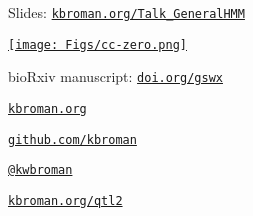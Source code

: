 \documentclass[aspectratio=169,12pt,t]{beamer}
\begin{document}
\begin{frame}[c]{}

\Large

Slides: \href{https://kbroman.org/Talk_GeneralHMM}{\tt kbroman.org/Talk\_GeneralHMM}

\vspace*{-7mm}
\hfill
\href{https://creativecommons.org/publicdomain/zero/1.0/}{\texttt{[image: Figs/cc-zero.png]}}

\vspace{3mm}

bioRxiv manuscript:
\href{https://doi.org/gswx}{\tt \lolit doi.org/gswx}

\vspace{4mm}

\href{https://kbroman.org}{\tt \lolit kbroman.org}

\vspace{4mm}

\href{https://github.com/kbroman}{\tt \lolit github.com/kbroman}

\vspace{4mm}

\href{https://twitter.com/kwbroman}{\tt \lolit @kwbroman}

\vspace{4mm}

\href{https://kbroman.org/qtl2}{\tt \lolit kbroman.org/qtl2}





\end{frame}
\end{document}
